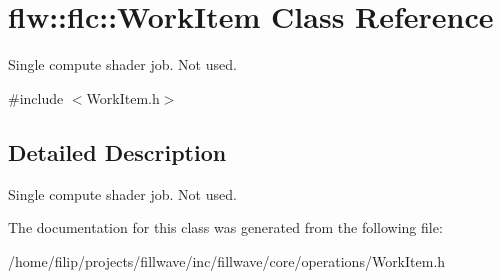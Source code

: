 \hypertarget{classflw_1_1flc_1_1WorkItem}{}\section{flw\+:\+:flc\+:\+:Work\+Item Class Reference}
\label{classflw_1_1flc_1_1WorkItem}


Single compute shader job. Not used.  




{\ttfamily \#include $<$Work\+Item.\+h$>$}



\subsection{Detailed Description}
Single compute shader job. Not used. 

The documentation for this class was generated from the following file\+:\begin{DoxyCompactItemize}
\item 
/home/filip/projects/fillwave/inc/fillwave/core/operations/Work\+Item.\+h\end{DoxyCompactItemize}
